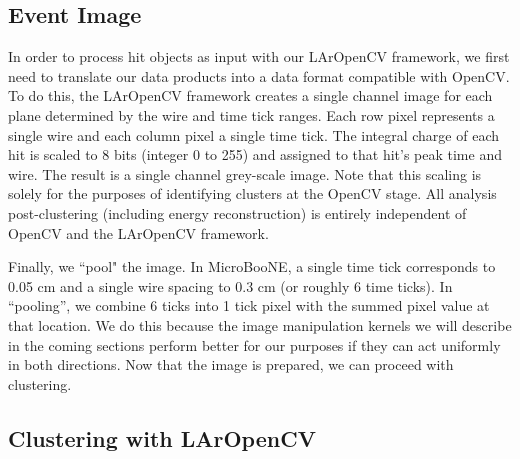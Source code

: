 \subsection{Event Image}
\par In order to process hit objects as input with our LArOpenCV framework, we first need to translate our data products into a data format compatible with OpenCV. To do this, the LArOpenCV framework creates a single channel image for each plane determined by the wire and time tick ranges. Each row pixel represents a single wire and each column pixel a single time tick. The integral charge of each hit is scaled to 8 bits (integer 0 to 255) and assigned to that hit's peak time and wire. The result is a single channel grey-scale image. Note that this scaling is solely for the purposes of identifying clusters at the OpenCV stage. All analysis post-clustering (including energy reconstruction) is entirely independent of OpenCV and the LArOpenCV framework. 
\par Finally, we ``pool" the image. In MicroBooNE, a single time tick corresponds to 0.05 cm and a single wire spacing to 0.3 cm (or roughly 6 time ticks).  In ``pooling'', we combine 6 ticks into 1 tick pixel with the summed pixel value at that location. We do this because the image manipulation kernels we will describe in the coming sections perform better for our purposes if they can act uniformly in both directions. Now that the image is prepared, we can proceed with clustering.
\subsection{Clustering with LArOpenCV }

